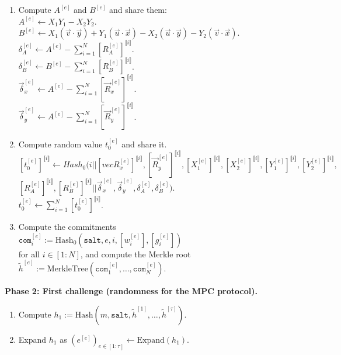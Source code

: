 \documentclass[english]{article}
\begin{document}
\begin{tcolorbox}[title=Protocol 15: Signing Algorithm, breakable, enhanced, colback=white, colframe=black]
\begin{enumerate}[label=\arabic*.]
				\item Compute $A^{[e]}$ and $B^{[e]}$ and share them: \\
				\quad $A^{[e]} \leftarrow X_1Y_1 - X_2Y_2$. \\
				\quad $B^{[e]} \leftarrow X_1(\vec{v} \cdot \vec{y}) + Y_1(\vec{u} \cdot \vec{x}) - X_2(\vec{u} \cdot \vec{y}) - Y_2(\vec{v} \cdot \vec{x})$. \\
				\quad $\delta_A^{[e]} \leftarrow A^{[e]} - \sum_{i=1}^{N} [R_A^{[e]}]^{\llbracket i \rrbracket}$. \\
				\quad $\delta_B^{[e]} \leftarrow B^{[e]} - \sum_{i=1}^{N} [R_B^{[e]}]^{\llbracket i \rrbracket}$. \\
				\quad $\vec{\delta}_x^{[e]} \leftarrow A^{[e]} - \sum_{i=1}^{N} [\vec{R}_x^{[e]}]^{\llbracket i \rrbracket}$. \\
				\quad $\vec{\delta}_y^{[e]} \leftarrow A^{[e]} - \sum_{i=1}^{N} [\vec{R}_y^{[e]}]^{\llbracket i \rrbracket}$.
				
				\item Compute random value $t_0^{[e]}$ and share it. \\
				\quad $[t_0^{[e]}]^{\llbracket i \rrbracket} \leftarrow Hash_0(i || [vec{R}_x^{[e]}]^{\llbracket i \rrbracket}, [\vec{R}_y^{[e]}]^{\llbracket i \rrbracket}, [X_1^{[e]}]^{\llbracket i \rrbracket}, [X_2^{[e]}]^{\llbracket i \rrbracket}, [Y_1^{[e]}]^{\llbracket i \rrbracket}, [Y_2^{[e]}]^{\llbracket i \rrbracket},$ \\ $[R_A^{[e]}]^{\llbracket i \rrbracket}, [R_B^{[e]}]^{\llbracket i \rrbracket} || \vec{\delta}_x^{[e]}, \vec{\delta}_y^{[e]}, \delta_A^{[e]}, \delta_B^{[e]})$. \\
				\quad $t_0^{[e]} \leftarrow \sum_{i=1}^{N} [t_0^{[e]}]^{\llbracket i \rrbracket}$.
				
				
				\item Compute the commitments \\
				\quad $\texttt{com}^{[e]}_i := \text{Hash}_0(\texttt{salt}, e, i, [w^{[e]}_i], [g^{[e]}_i])$ \\
				for all $i \in [1:N]$, and compute the Merkle root \\
				\quad $\tilde{h}^{[e]} := \text{MerkleTree}(\texttt{com}^{[e]}_1, \dots, \texttt{com}^{[e]}_N)$.
			\end{enumerate}
			
			\vspace{0.5em}
			\textbf{Phase 2: First challenge (randomness for the MPC protocol).}
			\begin{enumerate}[label=\arabic*.]
				\item Compute $h_1 := \text{Hash}(m, \texttt{salt}, \tilde{h}^{[1]}, \dots, \tilde{h}^{[\tau]})$.
				\item Expand $h_1$ as $(e^{[e]})_{e \in [1:\tau]} \leftarrow \text{Expand}(h_1)$.
			\end{enumerate}
			

\end{tcolorbox}
\end{document}
